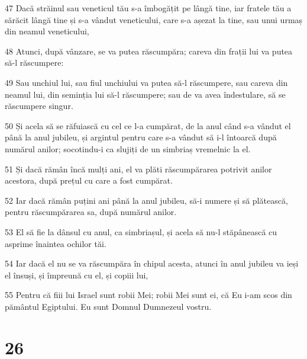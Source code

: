 \par 47 Dacă străinul sau veneticul tău s-a îmbogățit pe lângă tine, iar fratele tău a sărăcit lângă tine și s-a vândut veneticului, care s-a așezat la tine, sau unui urmaș din neamul veneticului,
\par 48 Atunci, după vânzare, se va putea răscumpăra; careva din frații lui va putea să-l răscumpere:
\par 49 Sau unchiul lui, sau fiul unchiului va putea să-l răscumpere, sau careva din neamul lui, din seminția lui să-l răscumpere; sau de va avea îndestulare, să se răscumpere singur.
\par 50 Și acela să se răfuiască cu cel ce l-a cumpărat, de la anul când s-a vândut el până la anul jubileu, și argintul pentru care s-a vândut să i-l întoarcă după numărul anilor; socotindu-i ca slujiți de un simbriaș vremelnic la el.
\par 51 Și dacă rămân încă mulți ani, el va plăti răscumpărarea potrivit anilor acestora, după prețul cu care a fost cumpărat.
\par 52 Iar dacă rămân puțini ani până la anul jubileu, să-i numere și să plătească, pentru răscumpărarea sa, după numărul anilor.
\par 53 El să fie la dânsul cu anul, ca simbriașul, și acela să nu-l stăpânească cu asprime înaintea ochilor tăi.
\par 54 Iar dacă el nu se va răscumpăra în chipul acesta, atunci în anul jubileu va ieși el însuși, și împreună cu el, și copiii lui,
\par 55 Pentru că fiii lui Israel sunt robii Mei; robii Mei sunt ei, că Eu i-am scos din pământul Egiptului. Eu sunt Domnul Dumnezeul vostru.

\chapter{26}

